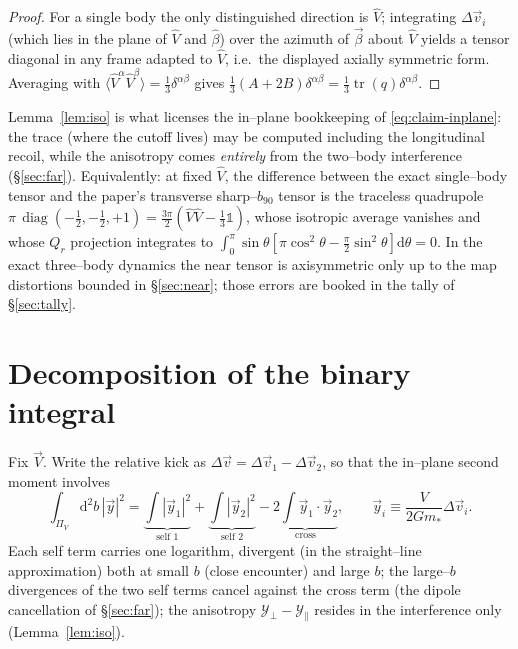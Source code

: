 \documentclass[11pt]{article}
\DeclareMathOperator{\diag}{diag}
\DeclareMathOperator{\Tr}{tr}
\newcommand{\dd}{\mathrm{d}}
\newcommand{\Vh}{\hat V}
\newcommand{\Yp}{\mathcal Y_\perp}
\newcommand{\Ypa}{\mathcal Y_\parallel}
\begin{document}
\begin{proof}
For a single body the only distinguished direction is $\Vh$; integrating $\Delta\vec v_i$ (which lies
in the plane of $\Vh$ and $\hat\beta$) over the azimuth of $\vec\beta$ about $\Vh$ yields a tensor
diagonal in any frame adapted to $\Vh$, i.e.\ the displayed axially symmetric form. Averaging with
$\langle\Vh^\alpha\Vh^\beta\rangle=\tfrac13\delta^{\alpha\beta}$ gives
$\tfrac13(A+2B)\delta^{\alpha\beta}=\tfrac13\Tr(q)\delta^{\alpha\beta}$.
\end{proof}

Lemma~\ref{lem:iso} is what licenses the in--plane bookkeeping of \eqref{eq:claim-inplane}: the trace
(where the cutoff lives) may be computed including the longitudinal recoil, while the anisotropy
comes \emph{entirely} from the two--body interference (\S\ref{sec:far}). Equivalently: at fixed
$\Vh$, the difference between the exact single--body tensor and the paper's transverse
sharp--$b_{90}$ tensor is the traceless quadrupole
$\pi\,\diag(-\tfrac12,-\tfrac12,+1)=\tfrac{3\pi}2(\Vh\Vh-\tfrac13\mathbb 1)$, whose isotropic
average vanishes and whose $Q_r$ projection integrates to
$\int_0^\pi\sin\theta[\pi\cos^2\theta-\tfrac\pi2\sin^2\theta]\dd\theta=0$. In the exact three--body
dynamics the near tensor is axisymmetric only up to the map distortions bounded in
\S\ref{sec:near}; those errors are booked in the tally of \S\ref{sec:tally}.

\section{Decomposition of the binary integral}
\label{sec:decomp}

Fix $\vec V$. Write the relative kick as $\Delta\vec v=\Delta\vec v_1-\Delta\vec v_2$, so that the
in--plane second moment involves
\begin{equation}
  \int_{\Pi_V}\!\dd^2b\,|\vec y|^2
  =\underbrace{\int|\vec y_1|^2}_{\text{self }1}+\underbrace{\int|\vec y_2|^2}_{\text{self }2}
   -\underbrace{2\int\vec y_1\!\cdot\!\vec y_2}_{\text{cross}},
  \qquad \vec y_i\equiv\frac{V}{2Gm_*}\Delta\vec v_i .
  \label{eq:selfcross}
\end{equation}
Each self term carries one logarithm, divergent (in the straight--line approximation) both at small
$b$ (close encounter) and large $b$; the large--$b$ divergences of the two self terms cancel against
the cross term (the dipole cancellation of \S\ref{sec:far}); the anisotropy $\Yp-\Ypa$ resides in
the interference only (Lemma~\ref{lem:iso}).
\end{document}
